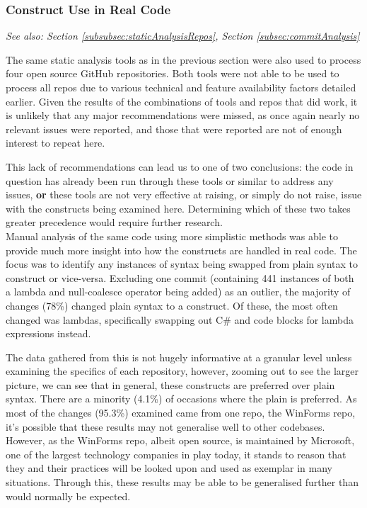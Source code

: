 \documentclass{article}
\begin{document}
        \subsubsection{Construct Use in Real Code}
            \textit{See also: Section \ref{subsubsec:staticAnalysisRepos}, Section \ref{subsec:commitAnalysis}}
            \newline

            \noindent The same static analysis tools as in the previous section were also used to process four open source GitHub repositories. Both tools were not able to be used to process all repos due to various technical and feature availability factors detailed earlier. Given the results of the combinations of tools and repos that did work, it is unlikely that any major recommendations were missed, as once again nearly no relevant issues were reported, and those that were reported are not of enough interest to repeat here.
            
            This lack of recommendations can lead us to one of two conclusions: the code in question has already been run through these tools or similar to address any issues, \textbf{or} these tools are not very effective at raising, or simply do not raise, issue with the constructs being examined here. Determining which of these two takes greater precedence would require further research.
            \\

            Manual analysis of the same code using more simplistic methods was able to provide much more insight into how the constructs are handled in real code. The focus was to identify any instances of syntax being swapped from plain syntax to construct or vice-versa. Excluding one commit (containing 441 instances of both a lambda and null-coalesce operator being added) as an outlier, the majority of changes (78\%) changed plain syntax to a construct. Of these, the most often changed was lambdas, specifically swapping out C\#  and  code blocks for lambda expressions instead.

            The data gathered from this is not hugely informative at a granular level unless examining the specifics of each repository, however, zooming out to see the larger picture, we can see that in general, these constructs are preferred over plain syntax. There are a minority (4.1\%) of occasions where the plain is preferred. As most of the changes (95.3\%) examined came from one repo, the WinForms repo, it's possible that these results may not generalise well to other codebases. However, as the WinForms repo, albeit open source, is maintained by Microsoft, one of the largest technology companies in play today, it stands to reason that they and their practices will be looked upon and used as exemplar in many situations. Through this, these results may be able to be generalised further than would normally be expected.
\end{document}
